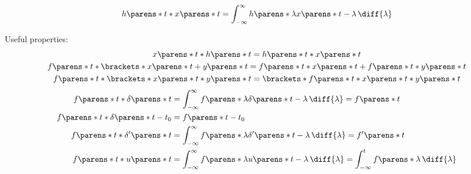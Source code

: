 \begin{multicols}{2}
\begin{CheatsheetEntryFrame}
    \end{CheatsheetEntryFrame}

    \begin{CheatsheetEntryFrame}

        \begin{equation*}
            h\parens*{t} * x\parens*{t}
            = \int_{-\infty}^\infty{
                h\parens*{\lambda} x\parens*{t - \lambda} \,\diff{\lambda}
            }
        \end{equation*}

        Useful properties:
        \begin{gather*}
            x\parens*{t} * h\parens*{t} = h\parens*{t} * x\parens*{t}
            \\
            f\parens*{t} * \brackets*{x\parens*{t} + y\parens*{t}}
            = f\parens*{t} * x\parens*{t} + f\parens*{t} * y\parens*{t}
            \\
            f\parens*{t} * \brackets*{x\parens*{t} * y\parens*{t}}
            = \brackets*{f\parens*{t} * x\parens*{t}} * y\parens*{t}
        \end{gather*}
        \begin{align*}
            f\parens*{t} * \delta\parens*{t}
            &= \int_{-\infty}^\infty {
                f\parens*{\lambda} \delta\parens*{t - \lambda} \,\diff{\lambda}
            }
            = f\parens*{t}
            \\
            f\parens*{t} * \delta\parens*{t - t_0}
            &= f\parens*{t - t_0}
            \\
            f\parens*{t} * \delta'\parens*{t}
            &= \int_{-\infty}^\infty {
                f\parens*{\lambda} \delta'\parens*{t - \lambda} \,\diff{\lambda}
            }
            = f'\parens*{t}
            \\
            f\parens*{t} * u\parens*{t}
            &= \int_{-\infty}^\infty {
                f\parens*{\lambda} u\parens*{t - \lambda} \,\diff{\lambda}
            }
            = \int_{-\infty}^t f\parens*{\lambda} \,\diff{\lambda}
        \end{align*}

    \end{CheatsheetEntryFrame}

    \begin{CheatsheetEntryFrame}


\end{CheatsheetEntryFrame}
\end{multicols}
